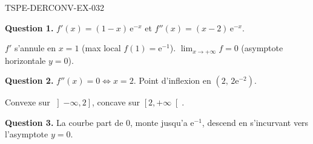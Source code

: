 \begin{corrige}{TSPE-DERCONV-EX-032}

\textbf{Question 1.} $f'(x) = (1-x)\,\mathrm{e}^{-x}$ et $f''(x) = (x-2)\,\mathrm{e}^{-x}$.


$f'$ s'annule en $x=1$ (max local $f(1)=\mathrm{e}^{-1}$). $\lim_{x\to+\infty} f = 0$ (asymptote horizontale $y=0$).

\textbf{Question 2.} $f''(x) = 0 \iff x = 2$. Point d'inflexion en $(2,\, 2\mathrm{e}^{-2})$.

Convexe sur $\left]-\infty, 2\right]$, concave sur $\left[2, +\infty\right[$.

\textbf{Question 3.} La courbe part de $0$, monte jusqu'a $\mathrm{e}^{-1}$, descend en s'incurvant vers l'asymptote $y=0$.

\end{corrige}
